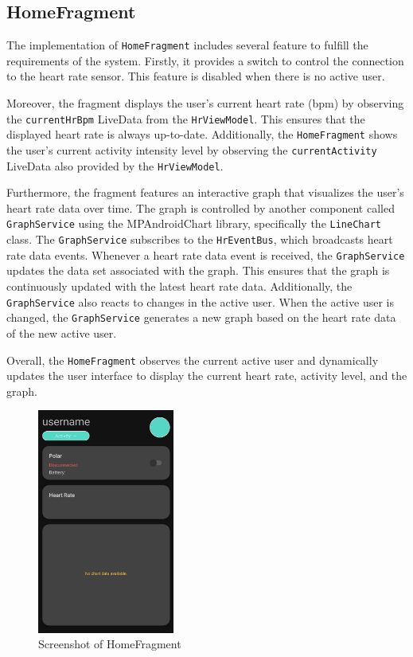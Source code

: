 \subsection{HomeFragment}
The implementation of \texttt{HomeFragment} includes several feature to fulfill the requirements of the system. 
Firstly, it provides a switch to control the connection to the heart rate sensor. This feature is disabled when there is no active user.

Moreover, the fragment displays the user's current heart rate (bpm) by observing the \texttt{currentHrBpm} LiveData from the \texttt{HrViewModel}. This ensures that the displayed heart rate is always up-to-date.
Additionally, the \texttt{HomeFragment} shows the user's current activity intensity level by observing the \texttt{currentActivity} LiveData also provided by the \texttt{HrViewModel}. 

Furthermore, the fragment features an interactive graph that visualizes the user's heart rate data over time. 
The graph is controlled by another component called \texttt{GraphService} using the MPAndroidChart library, specifically the \texttt{LineChart} class.
The \texttt{GraphService} subscribes to the \texttt{HrEventBus}, which broadcasts heart rate data events. 
Whenever a heart rate data event is received, the \texttt{GraphService} updates the data set associated with the graph. 
This ensures that the graph is continuously updated with the latest heart rate data.
Additionally, the \texttt{GraphService} also reacts to changes in the active user. 
When the active user is changed, the \texttt{GraphService} generates a new graph based on the heart rate data of the new active user. 

Overall, the \texttt{HomeFragment} observes the current active user and dynamically updates the user interface to display the current heart rate, activity level, and the graph.
\begin{figure}[H]
    \centering
    \includegraphics[width=0.4\textwidth]{images/homefragment-screenshot.png}
    \caption{Screenshot of HomeFragment}
    \label{fig:homefragment_screenshot}
\end{figure}

